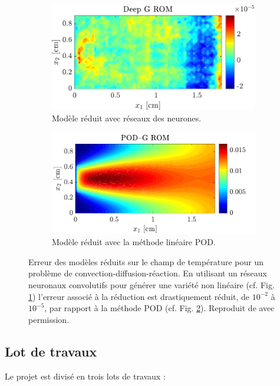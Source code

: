 \documentclass[12pt, french]{article}
\begin{document}
\begin{figure}[t]
	
	\begin{subfigure}[t]{0.465\textwidth}
		\includegraphics[width=\columnwidth]{DGROM_T_param1.pdf} 
		\caption{Modèle réduit avec réseaux des neurones.}
		\label{fig:DG_ROM}
	\end{subfigure}\hfill
	\begin{subfigure}[t]{0.48\textwidth}
		\includegraphics[width=\columnwidth]{GROM_T_param1.pdf}%
		\caption{Modèle réduit avec la méthode linéaire POD.}
		\label{fig:POD_ROM}
	\end{subfigure}
	\caption[]{Erreur des modèles réduits sur le champ de température pour un problème de convection-diffusion-réaction. En utilisant un réseaux neuronaux convolutifs pour générer une variété non linéaire (cf. Fig. \ref{fig:DG_ROM}) l'erreur associé à la réduction  est drastiquement réduit, de $10^{-2}$ à $10^{-5}$, par rapport à la méthode POD (cf. Fig. \ref{fig:POD_ROM}). Reproduit de \cite{lee2020} avec permission.}%
	\label{fig:deepROM}%
\end{figure}


\subsection{Lot de travaux}
Le projet est divisé en trois lots de travaux :
\end{document}
